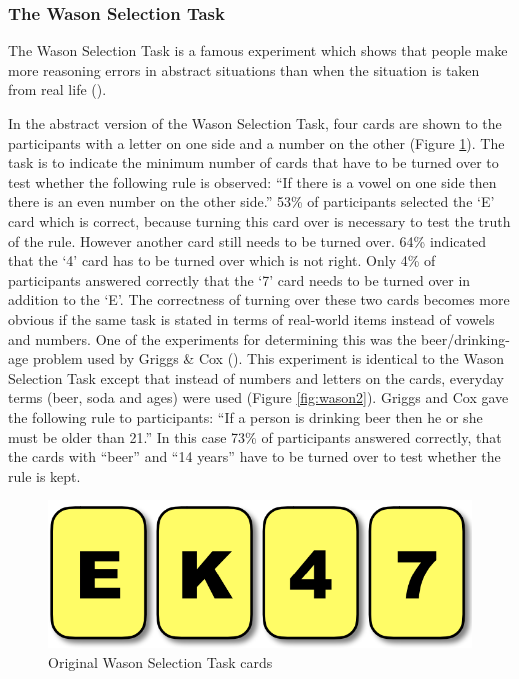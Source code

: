 \documentclass[
]{krantz}
\begin{document}
\subsubsection*{The Wason Selection Task}\label{the-wason-selection-task}


The Wason Selection Task is a famous experiment which shows that people make more reasoning errors in abstract situations than when the situation is taken from real life ().

In the abstract version of the Wason Selection Task, four cards are shown to the participants with a letter on one side and a number on the other (Figure \ref{fig:wason1}). The task is to indicate the minimum number of cards that have to be turned over to test whether the following rule is observed: ``If there is a vowel on one side then there is an even number on the other side.'' 53\% of participants selected the `E' card which is correct, because turning this card over is necessary to test the truth of the rule. However another card still needs to be turned over. 64\% indicated that the `4' card has to be turned over which is not right. Only 4\% of participants answered correctly that the `7' card needs to be turned over in addition to the `E'. The correctness of turning over these two cards becomes more obvious if the same task is stated in terms of real-world items instead of vowels and numbers. One of the experiments for determining this was the beer/drinking-age problem used by Griggs \& Cox (). This experiment is identical to the Wason Selection Task except that instead of numbers and letters on the cards, everyday terms (beer, soda and ages) were used (Figure \ref{fig:wason2}). Griggs and Cox gave the following rule to participants: ``If a person is drinking beer then he or she must be older than 21.'' In this case 73\% of participants answered correctly, that the cards with ``beer'' and ``14 years'' have to be turned over to test whether the rule is kept.

\begin{figure}

{\centering \includegraphics[width=0.6\linewidth]{images/ch9/fig2} 

}

\caption{Original Wason Selection Task cards}\label{fig:wason1}
\end{figure}
\end{document}
